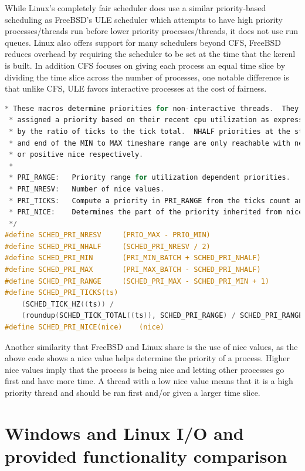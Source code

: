 \documentclass[letterpaper, 10pt, onecolumn, draftclsnofoot]{IEEEtran}
\begin{document}
While Linux's completely fair scheduler does use a similar priority-based scheduling as FreeBSD's ULE scheduler which attempts to have high priority processes/threads run before lower priority processes/threads, it does not use run queues. Linux also offers support for many schedulers beyond CFS, FreeBSD reduces overhead by requiring the scheduler to be set at the time that the kerenl is built. In addition CFS focuses on giving each process an equal time slice by dividing the time slice across the number of processes, one notable difference is that unlike CFS, ULE favors interactive processes at the cost of fairness.\cite{BSD, linux, jeff}

\begin{lstlisting}[language=C]
 * These macros determine priorities for non-interactive threads.  They are
 * assigned a priority based on their recent cpu utilization as expressed
 * by the ratio of ticks to the tick total.  NHALF priorities at the start
 * and end of the MIN to MAX timeshare range are only reachable with negative
 * or positive nice respectively.
 *
 * PRI_RANGE:	Priority range for utilization dependent priorities.
 * PRI_NRESV:	Number of nice values.
 * PRI_TICKS:	Compute a priority in PRI_RANGE from the ticks count and total.
 * PRI_NICE:	Determines the part of the priority inherited from nice.
 */
#define	SCHED_PRI_NRESV		(PRIO_MAX - PRIO_MIN)
#define	SCHED_PRI_NHALF		(SCHED_PRI_NRESV / 2)
#define	SCHED_PRI_MIN		(PRI_MIN_BATCH + SCHED_PRI_NHALF)
#define	SCHED_PRI_MAX		(PRI_MAX_BATCH - SCHED_PRI_NHALF)
#define	SCHED_PRI_RANGE		(SCHED_PRI_MAX - SCHED_PRI_MIN + 1)
#define	SCHED_PRI_TICKS(ts)						
    (SCHED_TICK_HZ((ts)) /						
    (roundup(SCHED_TICK_TOTAL((ts)), SCHED_PRI_RANGE) / SCHED_PRI_RANGE))
#define	SCHED_PRI_NICE(nice)	(nice)
\end{lstlisting}

Another similarity that FreeBSD and Linux share is the use of nice values, as the above code shows a nice value helps determine the priority of a process. Higher nice values imply that the process is being nice and letting other processes go first and have more time. A thread with a low nice value means that it is a high priority thread and should be ran first and/or given a larger time slice.\cite{BSD}

\section{Windows and Linux I/O and provided functionality comparison}
\end{document}
